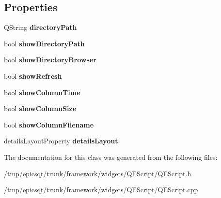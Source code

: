 \subsection*{Properties}
\begin{DoxyCompactItemize}
\item 
\hypertarget{classQEScript_a3fef95a5f0c7cf0e4a0ab91aefda2684}{
QString {\bfseries directoryPath}}
\label{classQEScript_a3fef95a5f0c7cf0e4a0ab91aefda2684}

\item 
\hypertarget{classQEScript_ab8db35b8b710d12ff80e0f80f9d75036}{
bool {\bfseries showDirectoryPath}}
\label{classQEScript_ab8db35b8b710d12ff80e0f80f9d75036}

\item 
\hypertarget{classQEScript_a203000f47d0971868a8d1509e2fd4be4}{
bool {\bfseries showDirectoryBrowser}}
\label{classQEScript_a203000f47d0971868a8d1509e2fd4be4}

\item 
\hypertarget{classQEScript_a180c7a886f9172fb03290fb3235d1ab3}{
bool {\bfseries showRefresh}}
\label{classQEScript_a180c7a886f9172fb03290fb3235d1ab3}

\item 
\hypertarget{classQEScript_a459766d26a2ad90417d745a8dc6a436d}{
bool {\bfseries showColumnTime}}
\label{classQEScript_a459766d26a2ad90417d745a8dc6a436d}

\item 
\hypertarget{classQEScript_a82c7a149e7bdb490b1e42a141a15372e}{
bool {\bfseries showColumnSize}}
\label{classQEScript_a82c7a149e7bdb490b1e42a141a15372e}

\item 
\hypertarget{classQEScript_a5fe2e1993c97e65a73aa84447bde1798}{
bool {\bfseries showColumnFilename}}
\label{classQEScript_a5fe2e1993c97e65a73aa84447bde1798}

\item 
\hypertarget{classQEScript_a6ea6c85be73bf88cc95bd0a0b91c5000}{
detailsLayoutProperty {\bfseries detailsLayout}}
\label{classQEScript_a6ea6c85be73bf88cc95bd0a0b91c5000}

\end{DoxyCompactItemize}


The documentation for this class was generated from the following files:\begin{DoxyCompactItemize}
\item 
/tmp/epicsqt/trunk/framework/widgets/QEScript/QEScript.h\item 
/tmp/epicsqt/trunk/framework/widgets/QEScript/QEScript.cpp\end{DoxyCompactItemize}
